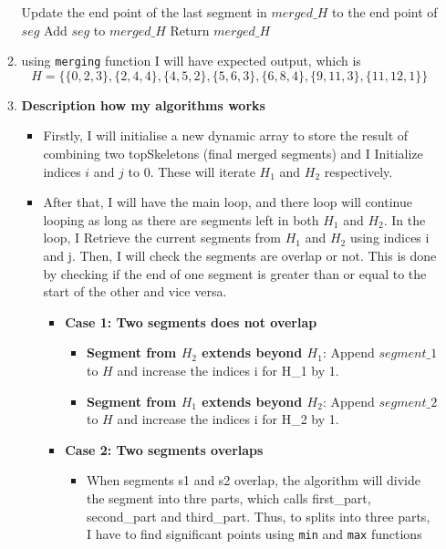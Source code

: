 \documentclass{article}
\begin{document}
\begin{enumerate}[label=({\alph*})]
\begin{enumerate}
\begin{algorithm}[H]
\begin{algorithmic}[1]
					\State Update the end point of the last segment in $\textit{merged\_H}$ to the end point of $\textit{seg}$
				\Else{}
					\State Add $\textit{seg}$ to $\textit{merged\_H}$
				\EndIf{}
			\EndFor{}
			\State Return $\textit{merged\_H}$
			\EndFunction{}
		\end{algorithmic}
		\end{algorithm}
		\item using \verb|merging| function I will have expected output, which is
		\[H = \{\{0, 2, 3\}, \{2, 4, 4\}, \{4, 5, 2\}, \{5, 6, 3\}, \{6, 8, 4\}, \{9, 11, 3\}, \{11, 12, 1\}\}\]
		\item \textbf{Description how my algorithms works}
		\begin{itemize}
			\item Firstly, I will initialise a new dynamic array to store the result of combining two topSkeletons (final merged segments) and I Initialize indices \(i\) and \(j\) to 0. These will iterate \(H_1\) and \(H_2\) respectively.
			\item After that, I will have the main loop, and there loop will continue looping as long as there are segments left in both \(H_1\) and \(H_2\). In the loop, I Retrieve the current segments from \(H_1\) and \(H_2\) using indices i and j. Then, I will check the segments are overlap or not. This is done by checking  if the end of one segment is greater than or equal to the start of the other and vice versa.
			\begin{itemize}
				\item \textbf{Case 1: Two segments does not overlap} 
				\begin{itemize}
					\item \textbf{Segment from $H_2$ extends beyond $H_1$}: Append $segment\_1$ to $H$ and increase the indices i for H\_1 by 1.
        			\item \textbf{Segment from $H_1$ extends beyond $H_2$}: Append $segment\_2$ to $H$ and  increase the indices i for H\_2 by 1.
				\end{itemize}
				\item \textbf{Case 2: Two segments overlaps} 
				\begin{itemize}
					\item When segments s1 and s2 overlap, the algorithm will divide the segment into thre parts, which calls first\_part, second\_part and third\_part. Thus, to splits into three parts, I have to find significant points using \verb|min| and \verb|max| functions 

\end{itemize}
\end{itemize}
\end{itemize}
\end{enumerate}
\end{enumerate}
\end{document}
